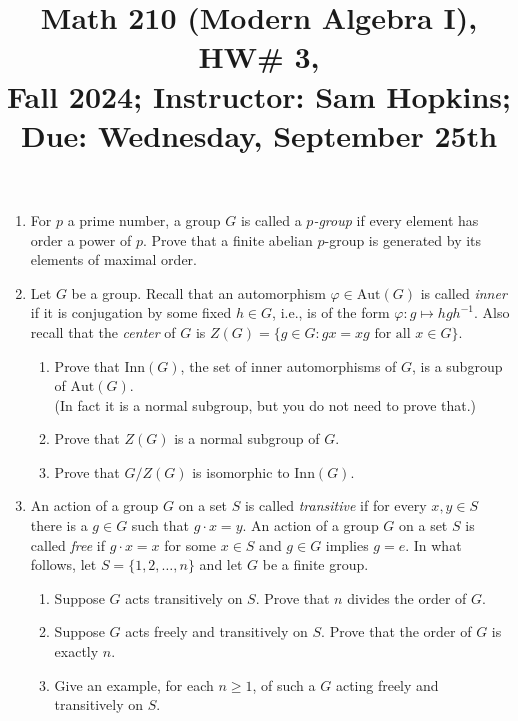 \documentclass[11pt]{article}
\title{Math 210 (Modern Algebra I), HW\# 3, \\ {\normalsize Fall 2024; Instructor: Sam Hopkins; Due: Wednesday, September 25th}}
\date{}
\begin{document}
\maketitle

\thispagestyle{empty}
\begin{enumerate}

\item For $p$ a prime number, a group $G$ is called a \emph{$p$-group} if every element has order a power of $p$. Prove that a finite abelian $p$-group is generated by its elements of maximal order.

\item Let $G$ be a group. Recall that an automorphism $\varphi\in \mathrm{Aut}(G)$ is called \emph{inner} if it is conjugation by some fixed $h\in G$, i.e., is of the form $\varphi\colon g\mapsto hgh^{-1}$. Also recall that the \emph{center} of $G$ is $Z(G) = \{g \in G\colon gx = xg \textrm{ for all $x\in G$}\}$. 
\begin{enumerate}
\item Prove that $\mathrm{Inn}(G)$, the set of inner automorphisms of $G$, is a subgroup of $\mathrm{Aut}(G)$. \\ (In fact it is a normal subgroup, but you do not need to prove that.)
\item Prove that $Z(G)$ is a normal subgroup of $G$.
\item Prove that $G/Z(G)$ is isomorphic to $\mathrm{Inn}(G)$.
\end{enumerate}

\item An action of a group $G$ on a set $S$ is called \emph{transitive} if for every $x,y \in S$ there is a $g\in G$ such that $g \cdot x = y$. An action of a group $G$ on a set $S$ is called \emph{free} if $g \cdot x = x$ for some $x\in S$ and $g\in G$ implies $g=e$. In what follows, let $S=\{1,2,\ldots,n\}$ and let $G$ be a finite group.
\begin{enumerate}
\item Suppose $G$ acts transitively on $S$. Prove that $n$ divides the order of $G$.
\item Suppose $G$ acts freely and transitively on $S$. Prove that the order of $G$ is exactly $n$.
\item Give an example, for each $n \geq 1$, of such a $G$ acting freely and transitively on $S$.
\end{enumerate}


\end{enumerate}
\end{document}
